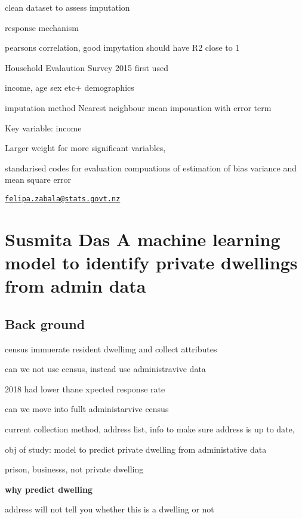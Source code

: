 \documentclass[
]{book}
\begin{document}
clean dataset to assess imputation

response mechanism

pearsons correlation, good impytation should have R2 close to 1

Household Evalaution Survey 2015 first used

income, age sex etc+ demographics

imputation method
Nearest neighbour mean impouation with error term

Key variable: income

Larger weight for more significant variables,

standarised codes for evaluation
compuations of estimation of bias variance and mean square error

\href{mailto:felipa.zabala@stats.govt.nz}{\nolinkurl{felipa.zabala@stats.govt.nz}}

\hypertarget{susmita-das-a-machine-learning-model-to-identify-private-dwellings-from-admin-data}{%
\chapter*{Susmita Das \textbar{} A machine learning model to identify private dwellings from admin data}\label{susmita-das-a-machine-learning-model-to-identify-private-dwellings-from-admin-data}}

\hypertarget{back-ground}{%
\section{Back ground}\label{back-ground}}

census immuerate resident dwellimg and collect attributes

can we not use census, instead use administravive data

2018 had lower thane xpected response rate

can we move into fullt administarvive census

current collection method, address list, info to make sure address is up to date,

obj of study: model to predict private dwelling from administative data

prison, businesss, not private dwelling

\textbf{why predict dwelling}

address will not tell you whether this is a dwelling or not
\end{document}

